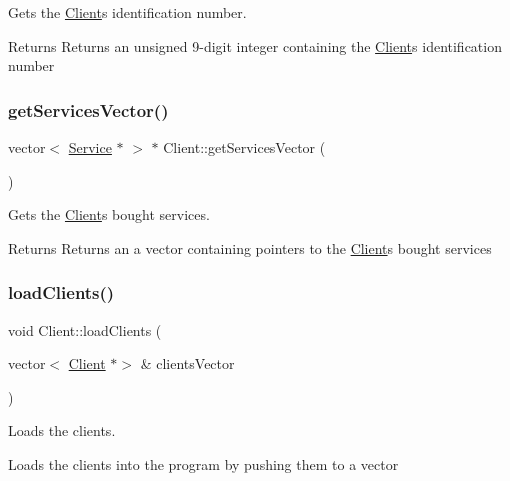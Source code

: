 Gets the \hyperlink{class_client}{Client}\textquotesingle{}s identification number. 

\begin{DoxyReturn}{Returns}
Returns an unsigned 9-\/digit integer containing the \hyperlink{class_client}{Client}\textquotesingle{}s identification number 
\end{DoxyReturn}
\mbox{\label{class_client_a13ab3e2d37fde2de5b6a40d4523bb999}} 
\subsubsection{\texorpdfstring{get\+Services\+Vector()}{getServicesVector()}}
{\footnotesize\ttfamily vector$<$ \hyperlink{class_service}{Service} $\ast$ $>$ $\ast$ Client\+::get\+Services\+Vector (\begin{DoxyParamCaption}{ }\end{DoxyParamCaption})}



Gets the \hyperlink{class_client}{Client}\textquotesingle{}s bought services. 

\begin{DoxyReturn}{Returns}
Returns an a vector containing pointers to the \hyperlink{class_client}{Client}\textquotesingle{}s bought services 
\end{DoxyReturn}
\mbox{\label{class_client_ac18a40ed6975665b7f7661c8dcf7bf1b}} 
\subsubsection{\texorpdfstring{load\+Clients()}{loadClients()}}
{\footnotesize\ttfamily void Client\+::load\+Clients (\begin{DoxyParamCaption}\item[{vector$<$ \hyperlink{class_client}{Client} $\ast$$>$ \&}]{clients\+Vector }\end{DoxyParamCaption})\hspace{0.3cm}{\ttfamily [static]}}



Loads the clients. 

Loads the clients into the program by pushing them to a vector


